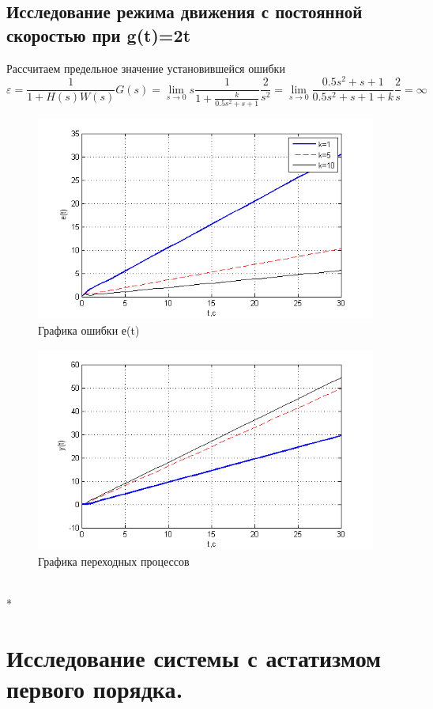 \documentclass[a4paper, 11pt]{article}
\begin{document}
\subsection{Исследование режима движения с постоянной скоростью при g(t)=2t}\hfill\par
Рассчитаем предельное значение установившейся ошибки\\
\begin{equation}
\varepsilon  = \frac{1}{{1 + H\left( s \right)W\left( s \right)}}G\left( s \right) = \mathop {\lim }\limits_{s \to 0} s\frac{1}{{1 + \frac{k}{{0.5{s^2} + s + 1}}}}\frac{2}{{{s^2}}} = \mathop {\lim }\limits_{s \to 0} \frac{{0.5{s^2} + s + 1}}{{0.5{s^2} + s + 1 + k}}\frac{2}{s} = \infty 
\end{equation}
\begin{center}

	\begin{figure}[h]
		\centering
			\includegraphics[width=0.7\linewidth]{33}
		\caption{Графика ошибки е(t)}
		\label{fig:33}
	\end{figure}
\end{center}

\begin{figure}[H]
	\centering
	\includegraphics[width=0.7\linewidth]{44}
	\caption{Графика переходных процессов}
	\label{fig:44}
\end{figure}
\hfill\\*
\newpage
\section{Исследование системы с астатизмом первого порядка.}\hfill\par
		
\end{document}

